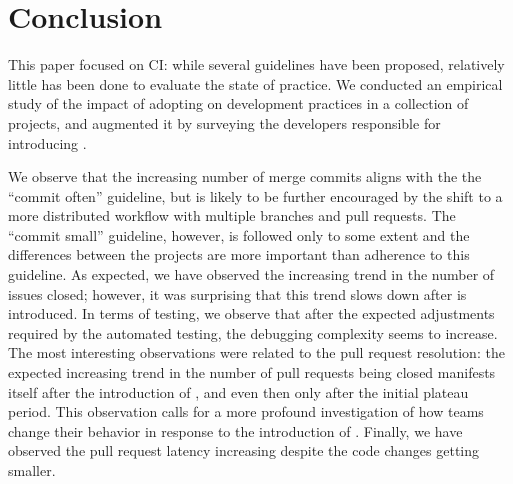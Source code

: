
\section{Conclusion}
\label{sec:conc}

This paper focused on CI: while several guidelines have been proposed, relatively little has been done to evaluate the 
state of practice.
We conducted an 
empirical study of the impact of adopting \Tvis on development practices in a collection of \GH projects,
and augmented it by surveying the developers responsible for introducing \Tvis. %

We observe that the increasing number of merge commits aligns with the the ``commit often'' guideline, but is likely to be further encouraged by the shift to a more distributed workflow with multiple branches and pull requests.
The ``commit small'' guideline, however, is followed only to some extent and the differences between the projects are more important than adherence to this guideline.
As expected, we have observed the increasing trend in the number of issues closed; however, it was surprising that this trend slows down after \Tvis is introduced.
In terms of testing, we observe that after the expected adjustments required by the automated testing, the debugging complexity seems to increase. 
The most interesting observations were related to the pull request resolution: the expected increasing trend in the number of pull requests being closed manifests itself after the introduction of \Tvis, and even then only after the initial plateau period. 
This observation calls for a more profound investigation of how \GH teams change their behavior in response to the introduction of \Tvis. 
Finally, we have observed the pull request latency increasing  despite the code changes getting smaller.
